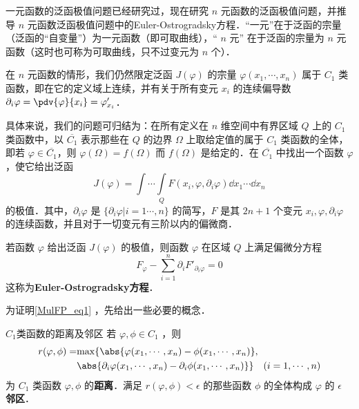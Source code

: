 
一元函数的泛函极值问题已经研究过，现在研究 $n$ 元函数的泛函极值问题，并推导 $n$ 元函数泛函极值问题中的Euler-Ostrogradsky方程．“一元”在于泛函的宗量（泛函的“自变量”）为一元函数（即可取曲线），“ $n$ 元” 在于泛函的宗量为 $n$ 元函数（这时也可称为可取曲线，只不过变元为 $n$ 个）．

在 $n$ 元函数的情形，我们仍然限定泛函 $J(\varphi)$ 的宗量 $\varphi(x_1,\cdots,x_n)$ 属于 $C_1$ 类函数，即在它的定义域上连续，并有关于所有变元 $x_i$ 的连续偏导数 $\partial_i\varphi=\pdv{\varphi}{x_i}=\varphi'_{x_i}$．

具体来说，我们的问题可归结为：在所有定义在 $n$ 维空间中有界区域 $Q$ 上的 $C_1$ 类函数中，以 $\overline{C_1}$ 表示那些在 $Q$ 的边界 $\Omega$ 上取给定值的属于 $C_1$ 类函数的全体，即若 $\varphi\in\overline{C_1}$，则 $\varphi(\Omega)=f(\Omega)$ 而 $f(\Omega)$ 是给定的．在 $\overline{C_1}$ 中找出一个函数 $\varphi$，使它给出泛函
\begin{equation}
J(\varphi)=\int\cdots\int\limits_Q F(x_i,\varphi,\partial_i\varphi)\dd x_1\cdots\dd x_n
\end{equation}
的极值．其中，$\partial_i\varphi$ 是 $\{\partial_i\varphi|i=1\cdots,n\}$ 的简写，$F$ 是其 $2n+1$ 个变元 $x_i,\varphi,\partial_i\varphi$ 的连续函数，并且对于一切变元有三阶以内的偏微商．

若函数 $\varphi$ 给出泛函 $J(\varphi)$ 的极值，则函数 $\varphi$ 在区域 $Q$ 上满足偏微分方程
\begin{equation}\label{MulFP_eq1}
F_\varphi-\sum_{i=1}^n\partial_i F'_{\partial_i\varphi}=0
\end{equation}
这称为\textbf{Euler-Ostrogradsky方程}．

为证明\autoref{MulFP_eq1} ，先给出一些必要的概念．
\begin{definition}{$C_1$类函数的距离及邻区}
若 $\varphi,\phi\in C_1$ ，则
\begin{equation}
\begin{aligned}
r(\varphi,\phi)=&\mathrm{max}\{\abs{\varphi(x_1,\cdots,x_n)-\phi(x_1,\cdots,x_n)},\\
&\abs{\partial_i\varphi(x_1,\cdots,x_n)-\partial_i\phi(x_1,\cdots,x_n)}\}\quad (i=1,\cdots,n)
\end{aligned}
\end{equation}
为 $C_1$ 类函数 $\varphi,\phi$ 的\textbf{距离}．满足 $r(\varphi,\phi)<\epsilon$ 的那些函数 $\phi$ 的全体构成 $\varphi$ 的 $\epsilon$ \textbf{邻区}． 
\end{definition}
